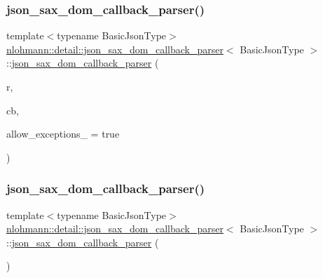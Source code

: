\subsubsection{\texorpdfstring{json\+\_\+sax\+\_\+dom\+\_\+callback\+\_\+parser()}{json\_sax\_dom\_callback\_parser()}\hspace{0.1cm}{\footnotesize\ttfamily [1/3]}}
{\footnotesize\ttfamily template$<$typename Basic\+Json\+Type$>$ \\
\hyperlink{classnlohmann_1_1detail_1_1json__sax__dom__callback__parser}{nlohmann\+::detail\+::json\+\_\+sax\+\_\+dom\+\_\+callback\+\_\+parser}$<$ Basic\+Json\+Type $>$\+::\hyperlink{classnlohmann_1_1detail_1_1json__sax__dom__callback__parser}{json\+\_\+sax\+\_\+dom\+\_\+callback\+\_\+parser} (\begin{DoxyParamCaption}\item[{Basic\+Json\+Type \&}]{r,  }\item[{const \hyperlink{classnlohmann_1_1detail_1_1json__sax__dom__callback__parser_a4f636086fa8e7cf26c35c8afd50903ce}{parser\+\_\+callback\+\_\+t}}]{cb,  }\item[{const bool}]{allow\+\_\+exceptions\+\_\+ = {\ttfamily true} }\end{DoxyParamCaption})\hspace{0.3cm}{\ttfamily [inline]}}

\mbox{\label{classnlohmann_1_1detail_1_1json__sax__dom__callback__parser_a589998730e650a425b1b311e2e9f7f09}} 
\subsubsection{\texorpdfstring{json\+\_\+sax\+\_\+dom\+\_\+callback\+\_\+parser()}{json\_sax\_dom\_callback\_parser()}\hspace{0.1cm}{\footnotesize\ttfamily [2/3]}}
{\footnotesize\ttfamily template$<$typename Basic\+Json\+Type$>$ \\
\hyperlink{classnlohmann_1_1detail_1_1json__sax__dom__callback__parser}{nlohmann\+::detail\+::json\+\_\+sax\+\_\+dom\+\_\+callback\+\_\+parser}$<$ Basic\+Json\+Type $>$\+::\hyperlink{classnlohmann_1_1detail_1_1json__sax__dom__callback__parser}{json\+\_\+sax\+\_\+dom\+\_\+callback\+\_\+parser} (\begin{DoxyParamCaption}\item[{const \hyperlink{classnlohmann_1_1detail_1_1json__sax__dom__callback__parser}{json\+\_\+sax\+\_\+dom\+\_\+callback\+\_\+parser}$<$ Basic\+Json\+Type $>$ \&}]{ }\end{DoxyParamCaption})\hspace{0.3cm}{\ttfamily [delete]}}

